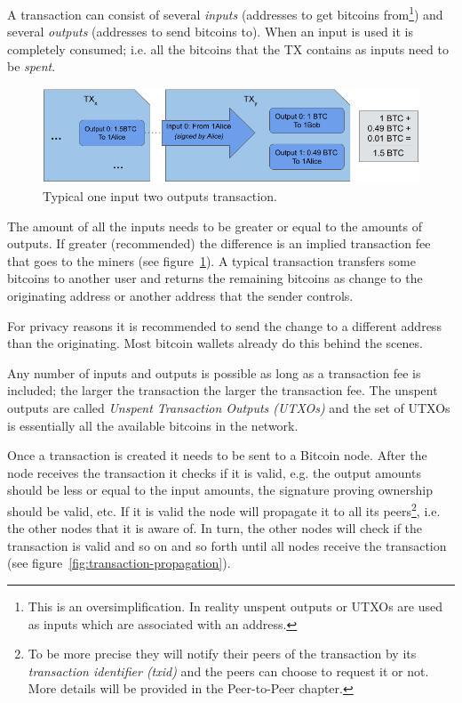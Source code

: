 A transaction can consist of several \emph{inputs} (addresses to get bitcoins from\footnote{This is an oversimplification. In reality unspent outputs or UTXOs are used as inputs which are associated with an address.}) and several \emph{outputs} (addresses to send bitcoins to). When an input is used it is completely consumed; i.e. all the bitcoins that the TX contains as inputs need to be \emph{spent}.

\begin{figure}[h]
\begin{center}
\includegraphics[scale=0.5]{images/typical-transaction}
\caption{Typical one input two outputs transaction.}
\label{fig:typical-transaction}
\end{center}
\end{figure}

The amount of all the inputs needs to be greater or equal to the amounts of outputs. If greater (recommended) the difference is an implied transaction fee that goes to the miners (see figure~\ref{fig:typical-transaction}). A typical transaction transfers some bitcoins to another user and returns the remaining bitcoins as change to the originating address or another address that the sender controls.

\begin{note}
For privacy reasons it is recommended to send the change to a different address than the originating. Most bitcoin wallets already do this behind the scenes.
\end{note}

Any number of inputs and outputs is possible as long as a transaction fee is included; the larger the transaction the larger the transaction fee. The unspent outputs are called \emph{Unspent Transaction Outputs (UTXOs)} and the set of UTXOs is essentially all the available bitcoins in the network.

Once a transaction is created it needs to be sent to a Bitcoin node. After the node receives the transaction it checks if it is valid, e.g. the output amounts should be less or equal to the input amounts, the signature proving ownership should be valid, etc. If it is valid the node will propagate it to all its peers\footnote{To be more precise they will notify their peers of the transaction by its \emph{transaction identifier (txid)} and the peers can choose to request it or not. More details will be provided in the Peer-to-Peer chapter.}, i.e. the other nodes that it is aware of. In turn, the other nodes will check if the transaction is valid and so on and so forth until all nodes receive the transaction (see figure~\ref{fig:transaction-propagation}).

